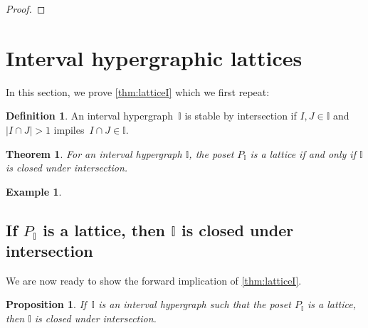 \documentclass[reqno]{amsart}
\newtheorem{theoremA}{Theorem}
\newtheorem{proposition}[theorem]{Proposition}
\theoremstyle{definition}
\newtheorem{definition}[theorem]{Definition}
\newtheorem{example}[theorem]{Example}
\newcommand{\vincent}[1]{\todo[size=\tiny,color=blue!30]{ #1 \\ \hfill --- V.}\,}
\newcommand{\II}{\mathbb I} %
\begin{document}
\begin{proof}
\end{proof}


\section{Interval hypergraphic lattices}
\label{sec:LatticePI}

In this section, we prove \cref{thm:latticeI} which we first repeat: %

\begin{definition}
An interval hypergraph~$\II$ is stable by intersection if $I, J \in \II$ and~$|I \cap J| > 1$ impiles~$I \cap J \in \II$.
\end{definition}

\begin{theoremA}
For an interval hypergraph $\II$, the poset $P_\II$ is a lattice if and only if $\II$ is closed under intersection.
\end{theoremA}

\begin{example}
\vincent{todo}
\end{example}


\subsection{If $P_\II$ is a lattice, then $\II$ is closed under intersection}  
\label{subsec:latticeForward}

We are now ready to show the forward implication of \cref{thm:latticeI}.

\begin{proposition}
\label{prop:latticeForward}
If~$\II$ is an interval  hypergraph such that the poset $P_\II$ is a lattice, then $\II$ is closed under intersection.
\end{proposition}
\end{document}
